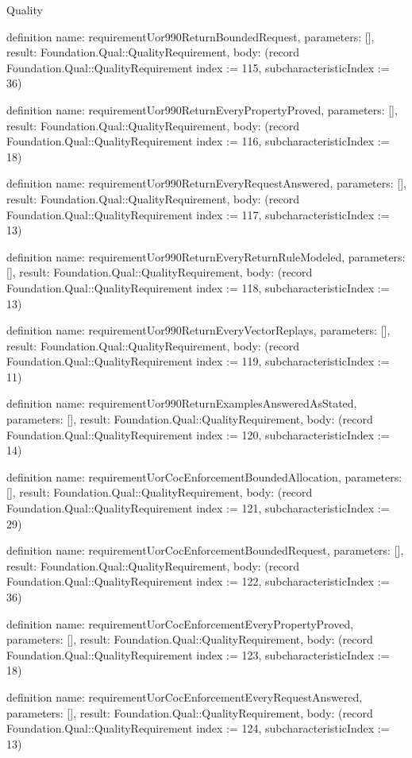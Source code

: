 \begin{lexlean}{Quality}
\begin{semanticmodule}
definition{
  name: requirementUor990ReturnBoundedRequest,
  parameters: [],
  result: Foundation.Qual::QualityRequirement,
  body: (record Foundation.Qual::QualityRequirement {index := 115, subcharacteristicIndex := 36})
}

definition{
  name: requirementUor990ReturnEveryPropertyProved,
  parameters: [],
  result: Foundation.Qual::QualityRequirement,
  body: (record Foundation.Qual::QualityRequirement {index := 116, subcharacteristicIndex := 18})
}

definition{
  name: requirementUor990ReturnEveryRequestAnswered,
  parameters: [],
  result: Foundation.Qual::QualityRequirement,
  body: (record Foundation.Qual::QualityRequirement {index := 117, subcharacteristicIndex := 13})
}

definition{
  name: requirementUor990ReturnEveryReturnRuleModeled,
  parameters: [],
  result: Foundation.Qual::QualityRequirement,
  body: (record Foundation.Qual::QualityRequirement {index := 118, subcharacteristicIndex := 13})
}

definition{
  name: requirementUor990ReturnEveryVectorReplays,
  parameters: [],
  result: Foundation.Qual::QualityRequirement,
  body: (record Foundation.Qual::QualityRequirement {index := 119, subcharacteristicIndex := 11})
}

definition{
  name: requirementUor990ReturnExamplesAnsweredAsStated,
  parameters: [],
  result: Foundation.Qual::QualityRequirement,
  body: (record Foundation.Qual::QualityRequirement {index := 120, subcharacteristicIndex := 14})
}

definition{
  name: requirementUorCocEnforcementBoundedAllocation,
  parameters: [],
  result: Foundation.Qual::QualityRequirement,
  body: (record Foundation.Qual::QualityRequirement {index := 121, subcharacteristicIndex := 29})
}

definition{
  name: requirementUorCocEnforcementBoundedRequest,
  parameters: [],
  result: Foundation.Qual::QualityRequirement,
  body: (record Foundation.Qual::QualityRequirement {index := 122, subcharacteristicIndex := 36})
}

definition{
  name: requirementUorCocEnforcementEveryPropertyProved,
  parameters: [],
  result: Foundation.Qual::QualityRequirement,
  body: (record Foundation.Qual::QualityRequirement {index := 123, subcharacteristicIndex := 18})
}

definition{
  name: requirementUorCocEnforcementEveryRequestAnswered,
  parameters: [],
  result: Foundation.Qual::QualityRequirement,
  body: (record Foundation.Qual::QualityRequirement {index := 124, subcharacteristicIndex := 13})
}


\end{semanticmodule}
\end{lexlean}
